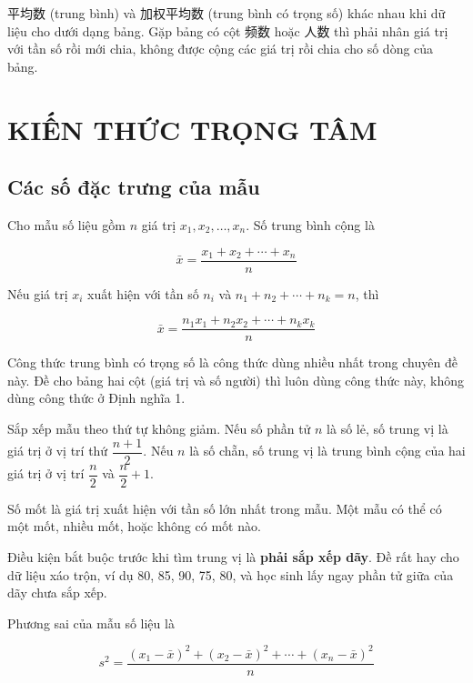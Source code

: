 \documentclass[11pt, a4paper]{article}
\begin{document}
 平均数 (trung bình) và 加权平均数 (trung bình có trọng số) khác nhau khi dữ liệu cho dưới dạng bảng. Gặp bảng có cột 频数 hoặc 人数 thì phải nhân giá trị với tần số rồi mới chia, không được cộng các giá trị rồi chia cho số dòng của bảng.

\section{KIẾN THỨC TRỌNG TÂM}

\subsection{Các số đặc trưng của mẫu}

\begin{dinhnghia}
Cho mẫu số liệu gồm $n$ giá trị $x_1, x_2, \ldots, x_n$. Số trung bình cộng là

$$\bar{x} = \frac{x_1 + x_2 + \cdots + x_n}{n}$$
\end{dinhnghia}
\begin{dinhnghia}
Nếu giá trị $x_i$ xuất hiện với tần số $n_i$ và $n_1 + n_2 + \cdots + n_k = n$, thì

$$\bar{x} = \frac{n_1 x_1 + n_2 x_2 + \cdots + n_k x_k}{n}$$

 Công thức trung bình có trọng số là công thức dùng nhiều nhất trong chuyên đề này. Đề cho bảng hai cột (giá trị và số người) thì luôn dùng công thức này, không dùng công thức ở Định nghĩa 1.
\end{dinhnghia}
\begin{dinhnghia}[{3 — Số trung vị}]
Sắp xếp mẫu theo thứ tự không giảm. Nếu số phần tử $n$ là số lẻ, số trung vị là giá trị ở vị trí thứ $\dfrac{n+1}{2}$. Nếu $n$ là số chẵn, số trung vị là trung bình cộng của hai giá trị ở vị trí $\dfrac{n}{2}$ và $\dfrac{n}{2} + 1$.
\end{dinhnghia}
\begin{dinhnghia}[{4 — Số mốt}]
Số mốt là giá trị xuất hiện với tần số lớn nhất trong mẫu. Một mẫu có thể có một mốt, nhiều mốt, hoặc không có mốt nào.

 Điều kiện bắt buộc trước khi tìm trung vị là \textbf{phải sắp xếp dãy}. Đề rất hay cho dữ liệu xáo trộn, ví dụ 80, 85, 90, 75, 80, và học sinh lấy ngay phần tử giữa của dãy chưa sắp xếp.
\end{dinhnghia}
\begin{dinhnghia}
Phương sai của mẫu số liệu là

$$s^2 = \frac{(x_1 - \bar{x})^2 + (x_2 - \bar{x})^2 + \cdots + (x_n - \bar{x})^2}{n}$$
\end{dinhnghia}
\end{document}
